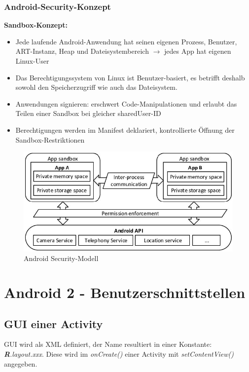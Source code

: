 \documentclass[a4paper]{article}
\begin{document}
	\subsubsection{Android-Security-Konzept}
	\textbf{Sandbox-Konzept:} 
	\begin{itemize}
		\item Jede laufende Android-Anwendung hat seinen eigenen Prozess, Benutzer, ART-Instanz, Heap und Dateisystembereich $\rightarrow$ jedes App hat eigenen Linux-User
		\item Das Berechtigungssystem von Linux ist Benutzer-basiert, es betrifft deshalb sowohl den Speicherzugriff wie auch das Dateisystem. 
		\item Anwendungen signieren: erschwert Code-Manipulationen und erlaubt das Teilen einer Sandbox bei gleicher sharedUser-ID
		\item Berechtigungen werden im Manifest deklariert, kontrollierte Öffnung der Sandbox-Restriktionen
	\end{itemize}
	\begin{figure}[htb!]
		\centering
		\includegraphics[width=12cm]{img/securitymodel.jpg}
		\caption{Android Security-Modell}
		\label{fig:secumodel}
	\end{figure}
	
	\newpage
\section{Android 2 - Benutzerschnittstellen}

\subsection{GUI einer Activity}

GUI wird als XML definiert, der Name resultiert in einer Konstante: \textit{\textbf{R}.layout.xxx}. Diese wird im \textit{onCreate()} einer Activity mit \textit{setContentView()} angegeben.
\end{document}
